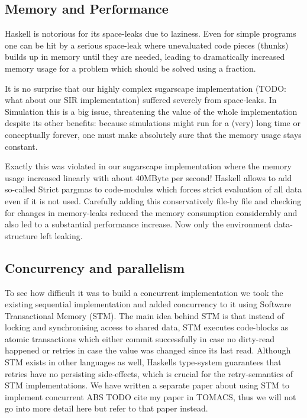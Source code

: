 \subsection{Memory and Performance}
Haskell is notorious for its space-leaks due to laziness. Even for simple programs one can be hit by a serious space-leak where unevaluated code pieces (thunks) builds up in memory until they are needed, leading to dramatically increased memory usage for a problem which should be solved using a fraction.

It is no surprise that our highly complex sugarscape implementation (TODO: what about our SIR implementation) suffered severely from space-leaks. In Simulation this is a big issue, threatening the value of the whole implementation despite its other benefits: because simulations might run for a (very) long time or conceptually forever, one must make absolutely sure that the memory usage stays constant.

Exactly this was violated in our sugarscape implementation where the memory usage increased linearly with about 40MByte per second! 
Haskell allows to add so-called Strict pargmas to code-modules which forces strict evaluation of all data even if it is not used. Carefully adding this conservatively file-by file and checking for changes in memory-leaks reduced the memory consumption considerably and also led to a substantial performance increase. Now only the environment data-structure left leaking.

\subsection{Concurrency and parallelism}
To see how difficult it was to build a concurrent implementation we took the existing sequential implementation and added concurrency to it using Software Transactional Memory (STM). The main idea behind STM is that instead of locking and synchronising access to shared data, STM executes code-blocks as atomic transactions which either commit successfully in case no dirty-read happened or retries in case the value was changed since its last read. Although STM exists in other languages as well, Haskells type-system guarantees that retries have no persisting side-effects, which is crucial for the retry-semantics of STM implementations. We have written a separate paper about using STM to implement concurrent ABS TODO cite my paper in TOMACS, thus we will not go into more detail here but refer to that paper instead. 

